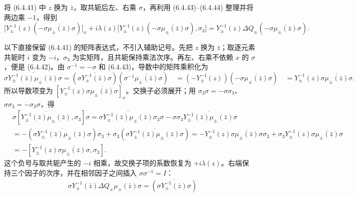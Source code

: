 \documentclass[lang=cn,scheme=chinese,mode=simple,device=normal,color=blue,
math=cm,thmcnt=section,12pt]{elegantbook}
\newcommand{\eqq}[2]{\tag{#1}\label{eq:#1}#2}
\begin{document}
将 (6.4.41) 中 $z$ 换为 $\bar z$，取共轭后左、右乘 $\sigma$，再利用 (6.4.43)–(6.4.44) 整理并将两边乘 $-1$，得到
\begin{equation}\eqq{6.4.45}{\bigl[Y_\pm^{-1}(z)(-\sigma\overline{\mu_\pm(\bar z)}\sigma)\bigr]_x +i\lambda(z)\bigl[Y_\pm^{-1}(z)(-\sigma\overline{\mu_\pm(\bar z)}\sigma),\sigma_3\bigr] =Y_\pm^{-1}(z)\Delta Q_\pm(-\sigma\overline{\mu_\pm(\bar z)}\sigma).}\end{equation}

\begin{callout}
    以下直接保留 (6.4.41) 的矩阵表达式，不引入辅助记号。先把 $z$ 换为 $\bar z$；取逐元素共轭时 $i$ 变为 $-i$，$\sigma_3$ 为实矩阵，且共轭保持乘法次序。再左、右乘不依赖 $x$ 的 $\sigma$，便是 (6.4.42)。由 $\sigma^{-1}=-\sigma$ 和 (6.4.43)，导数中的矩阵乘积化为
    \[
        \sigma\overline{Y_\pm^{-1}(\bar z)\mu_\pm(\bar z)}\sigma
        =(\sigma\overline{Y_\pm^{-1}(\bar z)}\sigma)
        (\sigma^{-1}\overline{\mu_\pm(\bar z)}\sigma)\quad
        =(-Y_\pm^{-1}(z))(-\sigma\overline{\mu_\pm(\bar z)}\sigma)\quad
        =Y_\pm^{-1}(z)\sigma\overline{\mu_\pm(\bar z)}\sigma.
    \]
    所以导数项变为 $[Y_\pm^{-1}(z)\sigma\overline{\mu_\pm(\bar z)}\sigma]_x$。交换子必须展开；用 $\sigma_3\sigma=-\sigma\sigma_3$、$\sigma\sigma_3=-\sigma_3\sigma$，得
    \[
        \begin{aligned}
             & \sigma[\overline{Y_\pm^{-1}(\bar z)\mu_\pm(\bar z)},\sigma_3]\sigma =\sigma\overline{Y_\pm^{-1}(\bar z)\mu_\pm(\bar z)}\sigma_3\sigma
            -\sigma\sigma_3\overline{Y_\pm^{-1}(\bar z)\mu_\pm(\bar z)}\sigma                                                                        \\
             & =-(\sigma\overline{Y_\pm^{-1}(\bar z)\mu_\pm(\bar z)}\sigma)\sigma_3
            +\sigma_3(\sigma\overline{Y_\pm^{-1}(\bar z)\mu_\pm(\bar z)}\sigma) =-Y_\pm^{-1}(z)\sigma\overline{\mu_\pm(\bar z)}\sigma\sigma_3
            +\sigma_3Y_\pm^{-1}(z)\sigma\overline{\mu_\pm(\bar z)}\sigma                                                                             \\
             & =-[Y_\pm^{-1}(z)\sigma\overline{\mu_\pm(\bar z)}\sigma,\sigma_3].
        \end{aligned}
    \]
    这个负号与取共轭产生的 $-i$ 相乘，故交换子项的系数恢复为 $+i\lambda(z)$。右端保持三个因子的次序，并在相邻因子之间插入 $\sigma\sigma^{-1}=I$：
    \[
        \begin{aligned}
             & \sigma\overline{Y_\pm^{-1}(\bar z)\Delta Q_\pm\mu_\pm(\bar z)}\sigma =(\sigma\overline{Y_\pm^{-1}(\bar z)}\sigma)

\end{aligned}\]
\end{callout}
\end{document}
